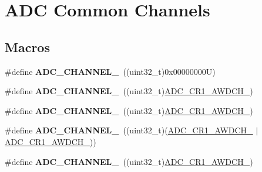 \hypertarget{group___a_d_c__channels}{}\section{A\+DC Common Channels}
\label{group___a_d_c__channels}
\subsection*{Macros}
\begin{DoxyCompactItemize}
\item 
\mbox{\label{group___a_d_c__channels_ga3c5075aee5af4eae02f1a72d6216199c}} 
\#define {\bfseries A\+D\+C\+\_\+\+C\+H\+A\+N\+N\+E\+L\+\_}~((uint32\+\_\+t)0x00000000\+U)
\item 
\mbox{\label{group___a_d_c__channels_gaeb119201733a871c94971c51843ffaac}} 
\#define {\bfseries A\+D\+C\+\_\+\+C\+H\+A\+N\+N\+E\+L\+\_}~((uint32\+\_\+t)\mbox{\hyperlink{group___peripheral___registers___bits___definition_ga18725d77c35c173cdb5bdab658d9dace}{A\+D\+C\+\_\+\+C\+R1\+\_\+\+A\+W\+D\+C\+H\+\_}})
\item 
\mbox{\label{group___a_d_c__channels_gad576132ebd78a3429be34f44e474c914}} 
\#define {\bfseries A\+D\+C\+\_\+\+C\+H\+A\+N\+N\+E\+L\+\_}~((uint32\+\_\+t)\mbox{\hyperlink{group___peripheral___registers___bits___definition_gafcd37244d74db7c9a34a4f08b94301ae}{A\+D\+C\+\_\+\+C\+R1\+\_\+\+A\+W\+D\+C\+H\+\_}})
\item 
\mbox{\label{group___a_d_c__channels_ga56dba5d35f1f7bcad41e4f9a7da3b125}} 
\#define {\bfseries A\+D\+C\+\_\+\+C\+H\+A\+N\+N\+E\+L\+\_}~((uint32\+\_\+t)(\mbox{\hyperlink{group___peripheral___registers___bits___definition_gafcd37244d74db7c9a34a4f08b94301ae}{A\+D\+C\+\_\+\+C\+R1\+\_\+\+A\+W\+D\+C\+H\+\_}} $\vert$ \mbox{\hyperlink{group___peripheral___registers___bits___definition_ga18725d77c35c173cdb5bdab658d9dace}{A\+D\+C\+\_\+\+C\+R1\+\_\+\+A\+W\+D\+C\+H\+\_}}))
\item 
\mbox{\label{group___a_d_c__channels_ga66f19737ad81a0a62eb97854d0e41a54}} 
\#define {\bfseries A\+D\+C\+\_\+\+C\+H\+A\+N\+N\+E\+L\+\_}~((uint32\+\_\+t)\mbox{\hyperlink{group___peripheral___registers___bits___definition_ga625eebdc95937325cad90a151853f5a0}{A\+D\+C\+\_\+\+C\+R1\+\_\+\+A\+W\+D\+C\+H\+\_}})

\end{DoxyCompactItemize}
